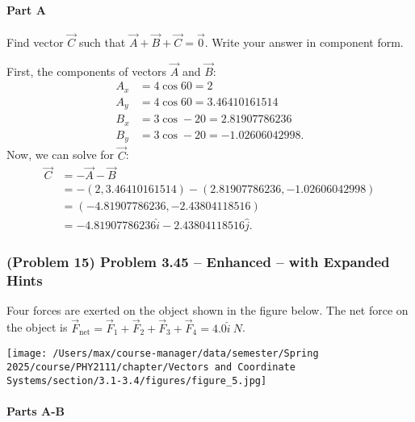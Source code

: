 \setcounter{partcounter}{1}
\paragraph{Part A}

Find vector $\vec{C}$ such that $\vec{A}+\vec{B}+\vec{C}=\vec{0}$. Write your answer in component form.

\begin{solution}
	First, the components of vectors $\vec{A}$ and $\vec{B}$:
	\begin{align*}
		A_{x} &= 4 \cos 60 = 2 \\
		A_{y} &= 4 \cos 60 = 3.46410161514 \\
		B_{x} &= 3 \cos -20 = 2.81907786236 \\
		B_{y} &= 3 \cos -20 = -1.02606042998
		.\end{align*}
	Now, we can solve for $\vec{C}$:
	\begin{align*}
		\vec{C} &= -\vec{A} - \vec{B} \\
		&= -\left( 2, 3.46410161514 \right) - \left( 2.81907786236, -1.02606042998 \right) \\
		&= \left( -4.81907786236, -2.43804118516 \right) \\
		&= -4.81907786236 \hat{i} - 2.43804118516 \hat{j}
		.\end{align*}
\end{solution}

\newpage

\subsubsection{(Problem 15) Problem 3.45 -- Enhanced -- with Expanded Hints}

Four forces are exerted on the object shown in the figure below. The net force on the object is $\vec{F}_{\mathrm{net}} = \vec{F}_{1} + \vec{F}_{2} + \vec{F}_{3} + \vec{F}_{4} = 4.0 \hat{i} \SI{}{N}$.

\begin{center}
	\texttt{[image: /Users/max/course-manager/data/semester/Spring 2025/course/PHY2111/chapter/Vectors and Coordinate Systems/section/3.1-3.4/figures/figure\_5.jpg]}
\end{center}

\setcounter{partcounter}{2}
\paragraph{Parts A-B}

